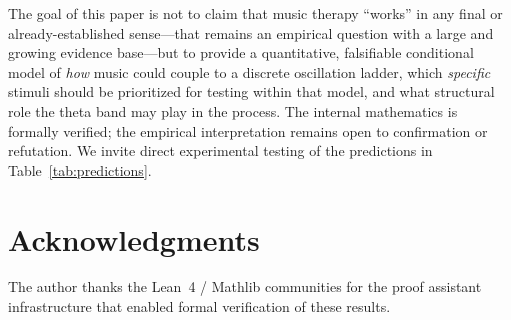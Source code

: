\documentclass[11pt,a4paper]{article}
\begin{document}
The goal of this paper is not to claim that music therapy ``works'' in
any final or already-established sense---that remains an empirical
question with a large and growing evidence base---but to provide a
quantitative, falsifiable conditional model of \emph{how} music could
couple to a discrete oscillation ladder, which \emph{specific} stimuli
should be prioritized for testing within that model, and what
structural role the theta band may play in the process. The internal
mathematics is formally verified; the empirical interpretation remains
open to confirmation or refutation. We invite direct experimental
testing of the predictions in Table~\ref{tab:predictions}.

\section*{Acknowledgments}

The author thanks the Lean~4 / Mathlib communities for the proof
assistant infrastructure that enabled formal verification of these
results.
\end{document}
